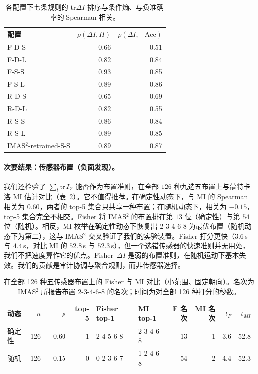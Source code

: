 \documentclass[11pt,a4paper]{article}
\begin{document}
\begin{table}[t]
\centering
\caption{各配置下七条规则的 $\mathrm{tr}\Delta I$ 排序与条件熵、与负准确率的 Spearman 相关。}
\label{tab:imas2-spearman}
\begin{tabular}{lrr}
\toprule
配置 & $\rho(\Delta I,H)$ & $\rho(\Delta I,-\mathrm{Acc})$ \\
\midrule
F-D-S & 0.66 & 0.51 \\
F-D-L & 0.82 & 0.84 \\
F-S-S & 0.93 & 0.85 \\
F-S-L & 0.89 & 0.86 \\
R-D-S & 0.65 & 0.69 \\
R-D-L & 0.82 & 0.55 \\
R-S-S & 0.86 & 0.84 \\
R-S-L & 0.89 & 0.85 \\
IMAS$^2$-retrained-S-S & 0.89 & 0.87 \\
\bottomrule
\end{tabular}
\end{table}

\paragraph{次要结果：传感器布置（负面发现）。}
我们还检验了 $\sum_t\mathrm{tr}\,I_Z$ 能否作为布置准则，在全部 $126$ 种九选五布置上与蒙特卡洛 MI 估计对比（表~\ref{tab:imas2-place}）。它不值得推荐。在确定性动态下，与 MI 的 Spearman 相关为 $0.60$，两者的 top-5 集合只共享一种布置；在随机动态下，相关为 $-0.15$，top-5 集合完全不相交。Fisher 将 IMAS$^2$ 的布置排在第 $13$ 位（确定性）与第 $54$ 位（随机）。相反，MI 枚举在确定性动态下恢复出 2-3-4-6-8 为最优布置（随机动态下为第二），这与 IMAS$^2$ 交叉验证了我们的实验装置。Fisher 打分更快（$3.6$\,s 与 $4.4$\,s，对比 MI 的 $52.8$\,s 与 $52.3$\,s），但一个选错传感器的快速准则并无用处，我们不把速度算作它的优点。Fisher~$\Delta I$ 是弱的布置准则，在随机运动下基本失效。我们的贡献是审计协调与聚合规则，而非传感器选择。

\begin{table}[t]
\centering
\footnotesize
\caption{在全部 126 种五传感器布置上的 Fisher 与 MI 对比（小范围、固定朝向）。名次为 IMAS$^2$ 所报告布置 2-3-4-6-8 的名次；时间为对全部 126 种打分的秒数。}
\label{tab:imas2-place}
\begin{tabular}{lrrrllrrrr}
\toprule
动态 & $n$ & $\rho$ & top-5 & Fisher top-1 & MI top-1 & F 名次 & MI 名次 & $t_F$ & $t_{MI}$ \\
\midrule
确定性 & 126 & $0.60$ & 1 & 2-4-5-6-8 & 2-3-4-6-8 & 13 & 1 & 3.6 & 52.8 \\
随机 & 126 & $-0.15$ & 0 & 0-2-3-6-7 & 1-2-4-6-8 & 54 & 2 & 4.4 & 52.3 \\
\bottomrule
\end{tabular}
\end{table}
\end{document}
